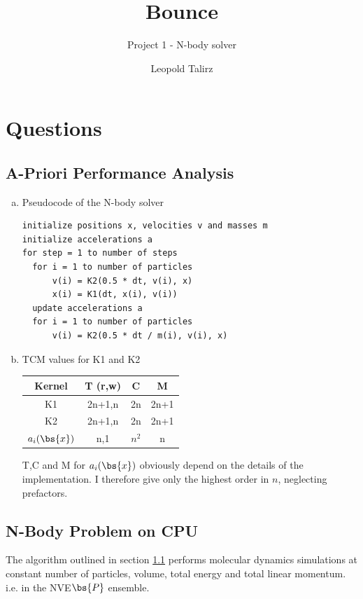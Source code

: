 \documentclass{scrartcl}
\title{Bounce}
\subtitle{Project 1 - N-body solver}
\author{Leopold Talirz}
\begin{document}
\maketitle
\tableofcontents
\clearpage

\section{Questions}

\subsection{A-Priori Performance Analysis}
\label{sec:pa}

\begin{enumerate}[a)]
    \item Pseudocode of the N-body solver
\begin{verbatim}
initialize positions x, velocities v and masses m
initialize accelerations a
for step = 1 to number of steps
  for i = 1 to number of particles
      v(i) = K2(0.5 * dt, v(i), x)
      x(i) = K1(dt, x(i), v(i))
  update accelerations a
  for i = 1 to number of particles
      v(i) = K2(0.5 * dt / m(i), v(i), x)
\end{verbatim}

    \item TCM values for K1 and K2

        \begin{tabular}[h]{c|ccc}
            Kernel & T (r,w) & C & M \\\hline
            K1 & 2n+1,n & 2n & 2n+1 \\
            K2 & 2n+1,n & 2n & 2n+1 \\
            $a_i(\bs{x})$ & n,1 & $n^2$ & n
        \end{tabular}

        T,C and M for $a_i(\bs{x})$ obviously depend on the details of the
        implementation. 
        I therefore give only the highest order in $n$, neglecting prefactors.
\end{enumerate}

\subsection{N-Body Problem on CPU}

The algorithm outlined in section \ref{sec:pa} 
performs molecular dynamics simulations at constant
number of particles, volume, total energy and total linear momentum.
i.e. in the NVE$\bs{P}$ ensemble.
\end{document}
